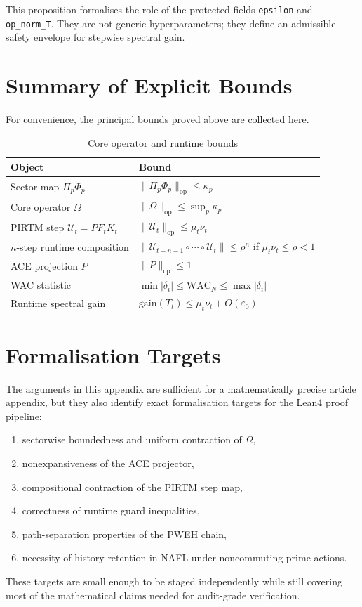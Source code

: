 \documentclass[12pt,a4paper]{article}
\theoremstyle{definition}
\theoremstyle{plain}
\theoremstyle{remark}
\begin{document}
\begin{invariantbox}
This proposition formalises the role of the protected fields
\texttt{epsilon} and \texttt{op\_norm\_T}. They are not generic hyperparameters;
they define an admissible safety envelope for stepwise spectral gain.
\end{invariantbox}

\section{Summary of Explicit Bounds}

For convenience, the principal bounds proved above are collected here.

\begin{table}[h!]
\centering
\caption{Core operator and runtime bounds}
\begin{tabular}{p{5cm}p{6.5cm}}
\toprule
\textbf{Object} & \textbf{Bound} \\
\midrule
Sector map $\Pi_p\Phi_p$ & $\|\Pi_p\Phi_p\|_{\mathrm{op}} \le \kappa_p$ \\
Core operator $\Omega$ & $\|\Omega\|_{\mathrm{op}} \le \sup_p \kappa_p$ \\
PIRTM step $\mathcal{U}_t = PF_tK_t$ & $\|\mathcal{U}_t\|_{\mathrm{op}} \le \mu_t\nu_t$ \\
$n$-step runtime composition & $\|\mathcal{U}_{t+n-1}\circ\cdots\circ\mathcal{U}_t\| \le \rho^n$ if $\mu_t\nu_t\le \rho<1$ \\
ACE projection $P$ & $\|P\|_{\mathrm{op}} \le 1$ \\
WAC statistic & $\min |\delta_i| \le \mathrm{WAC}_N \le \max |\delta_i|$ \\
Runtime spectral gain & $\mathrm{gain}(T_t) \le \mu_t\nu_t + O(\varepsilon_0)$ \\
\bottomrule
\end{tabular}
\end{table}

\section{Formalisation Targets}

The arguments in this appendix are sufficient for a mathematically precise
article appendix, but they also identify exact formalisation targets for the
Lean4 proof pipeline:
\begin{enumerate}
  \item sectorwise boundedness and uniform contraction of $\Omega$,
  \item nonexpansiveness of the ACE projector,
  \item compositional contraction of the PIRTM step map,
  \item correctness of runtime guard inequalities,
  \item path-separation properties of the PWEH chain,
  \item necessity of history retention in NAFL under noncommuting prime actions.
\end{enumerate}

These targets are small enough to be staged independently while still covering
most of the mathematical claims needed for audit-grade verification.

\nocite{*}
  
  
\end{document}
